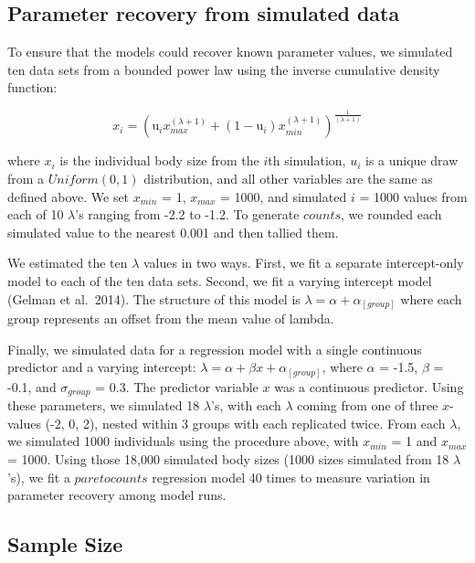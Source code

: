 \documentclass[
  12pt,
]{article}
\numberwithin{equation}
\begin{document}
\hypertarget{parameter-recovery-from-simulated-data}{%
\subsection{Parameter recovery from simulated
data}\label{parameter-recovery-from-simulated-data}}

To ensure that the models could recover known parameter values, we
simulated ten data sets from a bounded power law using the inverse
cumulative density function:

\[
x_i = (\text{u}_ix_{max}^{(\lambda+1)} +  (1-\text{u}_i)  x_{min}^{(\lambda+1)} ) ^ {\frac{1}{(\lambda+1)}}
\]

where \(x_i\) is the individual body size from the \(i\)th simulation,
\(u_i\) is a unique draw from a \(Uniform(0,1)\) distribution, and all
other variables are the same as defined above. We set \(x_{min}\) = 1,
\(x_{max}\) = 1000, and simulated \(i\) = 1000 values from each of 10
\(\lambda\)'s ranging from -2.2 to -1.2. To generate \(counts\), we
rounded each simulated value to the nearest 0.001 and then tallied them.

We estimated the ten \(\lambda\) values in two ways. First, we fit a
separate intercept-only model to each of the ten data sets. Second, we
fit a varying intercept model (Gelman et al.~2014). The structure of
this model is \(\lambda = \alpha + \alpha_{[group]}\) where each group
represents an offset from the mean value of lambda.

Finally, we simulated data for a regression model with a single
continuous predictor and a varying intercept:
\(\lambda = \alpha + \beta x + \alpha_{[group]}\), where \(\alpha\) =
-1.5, \(\beta\) = -0.1, and \(\sigma_{group}\) = 0.3. The predictor
variable \(x\) was a continuous predictor. Using these parameters, we
simulated 18 \(\lambda\)'s, with each \(\lambda\) coming from one of
three \(x\)-values (-2, 0, 2), nested within 3 groups with each
replicated twice. From each \(\lambda\), we simulated 1000 individuals
using the procedure above, with \(x_{min}\) = 1 and \(x_{max}\) = 1000.
Using those 18,000 simulated body sizes (1000 sizes simulated from 18
\(\lambda\)'s), we fit a \(paretocounts\) regression model 40 times to
measure variation in parameter recovery among model runs.

\hypertarget{sample-size}{%
\subsection{Sample Size}\label{sample-size}}
\end{document}
